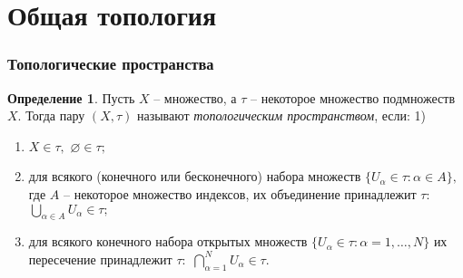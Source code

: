 \documentclass[b5paper]{book}
\theoremstyle{definition}
\newtheorem{definition}{Определение}
\let\emptyset\varnothing
\begin{document}
\section* {Общая топология}

\subsubsection*{Топологические пространства}

\begin{definition}
 Пусть $X$ -- множество, а $\tau$ -- некоторое множество подмножеств $X.$ Тогда пару
 $(X, \tau)$ называют  \emph{топологическим пространством}, если: 1\textdegree)
 \begin{enumerate}[label={\arabic*\textdegree.}] %
  \item $X\in \tau,$ $\emptyset \in \tau;$
  \item для всякого (конечного или бесконечного) набора множеств
  $\{U_\alpha \in \tau: \alpha \in A\},$ где $A$ -- некоторое множество индексов,
  их объединение принадлежит $\tau:$ $\bigcup\limits_{\alpha \in A} U_\alpha \in \tau;$
  \item для всякого конечного набора открытых множеств
  $\{U_\alpha\in\tau: \alpha = 1, \dots , N\}$ их пересечение принадлежит $\tau:$
  $\bigcap\limits_{\alpha=1}^{N} U_\alpha \in \tau.$
 \end{enumerate}
\end{definition}


%

\printindex
\end{document}

